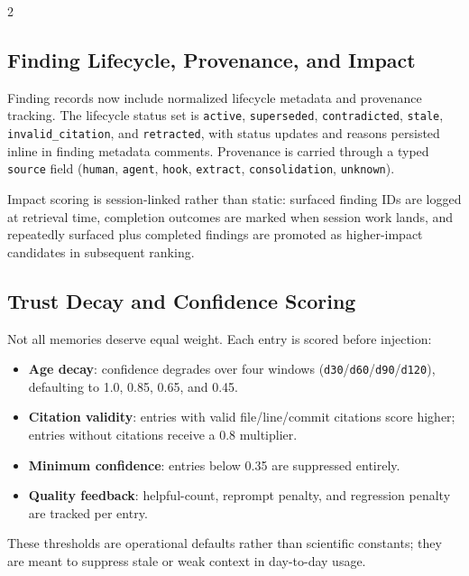 \documentclass[10pt]{article}
\begin{document}
\begin{multicols}{2}
\subsection{Finding Lifecycle, Provenance, and Impact}
Finding records now include normalized lifecycle metadata and provenance tracking. The lifecycle status set is \texttt{active}, \texttt{superseded}, \texttt{contradicted}, \texttt{stale}, \texttt{invalid\_citation}, and \texttt{retracted}, with status updates and reasons persisted inline in finding metadata comments. Provenance is carried through a typed \texttt{source} field (\texttt{human}, \texttt{agent}, \texttt{hook}, \texttt{extract}, \texttt{consolidation}, \texttt{unknown}).

Impact scoring is session-linked rather than static: surfaced finding IDs are logged at retrieval time, completion outcomes are marked when session work lands, and repeatedly surfaced plus completed findings are promoted as higher-impact candidates in subsequent ranking.

\subsection{Trust Decay and Confidence Scoring}
\label{sec:decay}

Not all memories deserve equal weight. Each entry is scored before injection:
\begin{itemize}
  \item \textbf{Age decay}: confidence degrades over four windows (\texttt{d30}/\texttt{d60}/\texttt{d90}/\texttt{d120}), defaulting to 1.0, 0.85, 0.65, and 0.45.
  \item \textbf{Citation validity}: entries with valid file/line/commit citations score higher; entries without citations receive a 0.8 multiplier.
  \item \textbf{Minimum confidence}: entries below 0.35 are suppressed entirely.
  \item \textbf{Quality feedback}: helpful-count, reprompt penalty, and regression penalty are tracked per entry.
\end{itemize}
These thresholds are operational defaults rather than scientific constants; they are meant to suppress stale or weak context in day-to-day usage.


\end{multicols}
\end{document}
